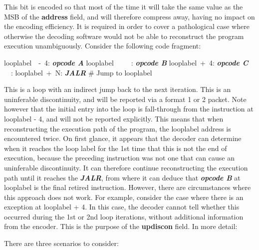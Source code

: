This bit is encoded so that most of the time it will take the same value as the MSB of the \textbf{address} field,
and will therefore compress away, having no impact on the encoding efficiency.  It is required in order to cover a
pathological case where otherwise the decoding software would not be able to reconstruct the program execution
unambiguously.  Consider the following code fragment:

looplabel~~-~4: \textbf{\textit{opcode A}} \newline
looplabel~~~~~: \textbf{\textit{opcode B}} \newline
looplabel~+~4: \textbf{\textit{opcode C}} \newline
~~: \newline
looplabel~+~N: \textbf{\textit{JALR}} \# Jump to looplabel\newline

This is a loop with an indirect jump back to the next iteration.  This is an uninferable discontinuity, and will be
reported via a format 1 or 2 packet.  Note however that the initial entry into the loop is fall-through from the
instruction at looplabel - 4, and will not be reported explicitly.  This means that when reconstructing the execution 
path of the program, the looplabel address is encountered twice.  On first glance, it appears that the decoder can determine
when it reaches the loop label for the 1st time that this is not the end of execution, because the preceding
instruction was not one that can cause an uninferable discontinuity.  It can therefore continue reconstructing the 
execution path until it reaches the \textbf{\textit{JALR}}, from where it can deduce that \textbf{\textit{opcode B}} at
looplabel is the final retired instruction.  However, there are circumstances where this approach 
does not work.  For example, consider the case where there is an exception at looplabel + 4.  In this case, the decoder
cannot tell whether this occurred during the 1st or 2nd loop iterations, without additional information from the 
encoder.  This is the purpose of the \textbf{updiscon} field.  In more detail:

There are three scenarios to consider:

